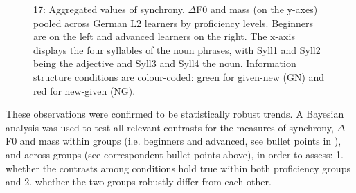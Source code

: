   
 

\begin{stylecaption}\begin{figure}
\caption{17: Aggregated values of synchrony, ${\Delta}$F0 and mass (on the y-axes) pooled across German L2 learners by proficiency levels. Beginners are on the left and advanced learners on the right. The x-axis displays the four syllables of the noun phrases, with Syll1 and Syll2 being the adjective and Syll3 and Syll4 the noun. Information structure conditions are colour-coded: green for given-new (GN) and red for new-given (NG).}
\label{fig:key:2}
\end{figure}\end{stylecaption}

These observations were confirmed to be statistically robust trends. A Bayesian analysis was used to test all relevant contrasts for the measures of synchrony, ${\Delta}$F0 and mass within groups (i.e. beginners and advanced, see bullet points in ), and across groups (see correspondent bullet points above), in order to assess: 1. whether the contrasts among conditions hold true within both proficiency groups and 2. whether the two groups robustly differ from each other.

